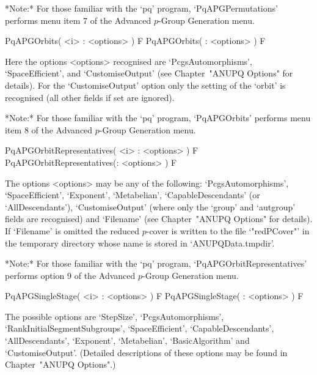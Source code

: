 *Note:* For those familiar  with  the  `pq'  program,  `PqAPGPermutations'
performs menu item 7 of the Advanced $p$-Group Generation menu.

\>PqAPGOrbits( <i> : <options> ) F
\>PqAPGOrbits( : <options> ) F


Here   the   options   <options>  recognised   are   `PcgsAutomorphisms',
`SpaceEfficient', and `CustomiseOutput'  (see Chapter~"ANUPQ Options" for
details).   For the  `CustomiseOutput'  option only  the  setting of  the
`orbit' is recognised (all other fields if set are ignored).

*Note:* For those familiar with the `pq' program,  `PqAPGOrbits'  performs
menu item 8 of the Advanced $p$-Group Generation menu.

\>PqAPGOrbitRepresentatives( <i> : <options> ) F
\>PqAPGOrbitRepresentatives(: <options> ) F


The options  <options> may be any of  the following: `PcgsAutomorphisms',
`SpaceEfficient',  `Exponent',   `Metabelian',  `CapableDescendants'  (or
`AllDescendants'),   `CustomiseOutput'  (where   only  the   `group'  and
`autgroup'  fields  are recognised)  and  `Filename' (see  Chapter~"ANUPQ
Options" for details).  If `Filename' is omitted the reduced $p$-cover is
written to the  file `"redPCover"' in the temporary  directory whose name
is stored in `ANUPQData.tmpdir'.

*Note:*
For those familiar  with  the  `pq'  program,  `PqAPGOrbitRepresentatives'
performs option 9 of the Advanced $p$-Group Generation menu.

\>PqAPGSingleStage( <i> : <options> ) F
\>PqAPGSingleStage( : <options> ) F


The    possible     options    are    `StepSize',    `PcgsAutomorphisms',
`RankInitialSegmentSubgroups',   `SpaceEfficient',  `CapableDescendants',
`AllDescendants',   `Exponent',    `Metabelian',   `BasicAlgorithm'   and
`CustomiseOutput'. (Detailed  descriptions of these options  may be found
in Chapter~"ANUPQ Options".)


